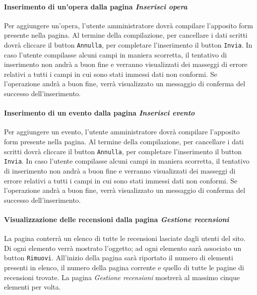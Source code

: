 \paragraph{Inserimento di un'opera dalla pagina \textit{Inserisci opera}}
\label{analisi-casi-uso-attori-principali-utente-amministratore-4}
Per aggiungere un'opera, l'utente amministratore dovrà compilare l'apposito form presente nella pagina. Al termine della compilazione, per cancellare i dati scritti dovrà cliccare il button \texttt{Annulla}, per completare l'inserimento il button \texttt{Invia}. In caso l'utente compilasse alcuni campi in maniera scorretta, il tentativo di inserimento non andrà a buon fine e verranno visualizzati dei masseggi di errore relativi a tutti i campi in cui sono stati immessi dati non conformi. Se l'operazione andrà a buon fine, verrà visualizzato un messaggio di conferma del successo dell'inserimento.


\paragraph{Inserimento di un evento dalla pagina \textit{Inserisci evento}}
\label{analisi-casi-uso-attori-principali-utente-amministratore-5}
Per aggiungere un evento, l'utente amministratore dovrà compilare l'apposito form presente nella pagina. Al termine della compilazione, per cancellare i dati scritti dovrà cliccare il button \texttt{Annulla}, per completare l'inserimento il button \texttt{Invia}. In caso l'utente compilasse alcuni campi in maniera scorretta, il tentativo di inserimento non andrà a buon fine e verranno visualizzati dei masseggi di errore relativi a tutti i campi in cui sono stati immessi dati non conformi. Se l'operazione andrà a buon fine, verrà visualizzato un messaggio di conferma del successo dell'inserimento.


\paragraph{Visualizzazione delle recensioni dalla pagina \textit{Gestione recensioni}}
\label{analisi-casi-uso-attori-principali-utente-amministratore-6}
La pagina conterrà un elenco di tutte le recensioni lasciate dagli utenti del sito. Di ogni elemento verrà mostrato l'oggetto; ad ogni elemento sarà associato un button \texttt{Rimuovi}. All'inizio della pagina sarà riportato il numero di elementi presenti in elenco, il numero della pagina corrente e quello di tutte le pagine di recensioni trovate. La pagina \textit{Gestione recensioni} mostrerà al massimo cinque elementi per volta.


